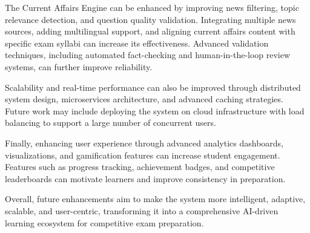 \begin{sloppypar}
The Current Affairs Engine can be enhanced by improving news filtering, topic relevance detection, and question quality validation. Integrating multiple news sources, adding multilingual support, and aligning current affairs content with specific exam syllabi can increase its effectiveness. Advanced validation techniques, including automated fact-checking and human-in-the-loop review systems, can further improve reliability.

Scalability and real-time performance can also be improved through distributed system design, microservices architecture, and advanced caching strategies. Future work may include deploying the system on cloud infrastructure with load balancing to support a large number of concurrent users.

Finally, enhancing user experience through advanced analytics dashboards, visualizations, and gamification features can increase student engagement. Features such as progress tracking, achievement badges, and competitive leaderboards can motivate learners and improve consistency in preparation.

Overall, future enhancements aim to make the system more intelligent, adaptive, scalable, and user-centric, transforming it into a comprehensive AI-driven learning ecosystem for competitive exam preparation.

\end{sloppypar}